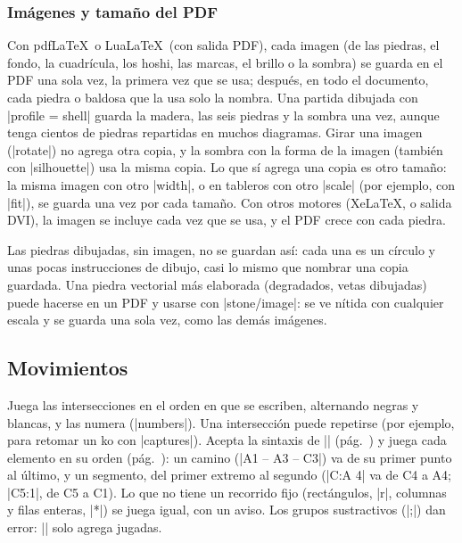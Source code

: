 \subsubsection{Imágenes y tamaño del PDF}
\label{subsubsec:imagenespdf}

Con pdf\LaTeX\ o Lua\LaTeX\ (con salida PDF), cada imagen (de las piedras, el fondo, la cuadrícula, los hoshi, las marcas, el brillo o la sombra) se guarda en el PDF una sola vez, la primera vez que se usa; después, en todo el documento, cada piedra o baldosa que la usa solo la nombra. Una partida dibujada con |profile = shell| guarda la madera, las seis piedras y la sombra una vez, aunque tenga cientos de piedras repartidas en muchos diagramas. Girar una imagen (|rotate|) no agrega otra copia, y la sombra con la forma de la imagen (también con |silhouette|) usa la misma copia. Lo que sí agrega una copia es otro tamaño: la misma imagen con otro |width|, o en tableros con otro |scale| (por ejemplo, con |fit|), se guarda una vez por cada tamaño. Con otros motores (Xe\LaTeX, o salida DVI), la imagen se incluye cada vez que se usa, y el PDF crece con cada piedra.

Las piedras dibujadas, sin imagen, no se guardan así: cada una es un círculo y unas pocas instrucciones de dibujo, casi lo mismo que nombrar una copia guardada. Una piedra vectorial más elaborada (degradados, vetas dibujadas) puede hacerse en un PDF y usarse con |stone/image|: se ve nítida con cualquier escala y se guarda una sola vez, como las demás imágenes.





\subsection{Movimientos}
\label{subsec:movimientos}

\begin{command}{\moves{}}

	Juega las intersecciones en el orden en que se escriben, alternando negras y blancas, y las numera (|numbers|). Una intersección puede repetirse (por ejemplo, para retomar un ko con |captures|). Acepta la sintaxis de |\stones| (pág.~\pageref{subsec:sintaxis-de-coordenadas}) y juega cada elemento en su orden (pág.~\pageref{subsec:orden-coordenadas}): un camino (|A1 -- A3 -- C3|) va de su primer punto al último, y un segmento, del primer extremo al segundo (|C:A 4| va de C4 a A4; |C5:1|, de C5 a C1). Lo que no tiene un recorrido fijo (rectángulos, |r|, columnas y filas enteras, |*|) se juega igual, con un aviso. Los grupos sustractivos (|;|) dan error: |\moves| solo agrega jugadas.

	\begin{codeexample}[]
		\begin{goban}[5]
		\end{goban}
	\end{codeexample}
\end{command}

